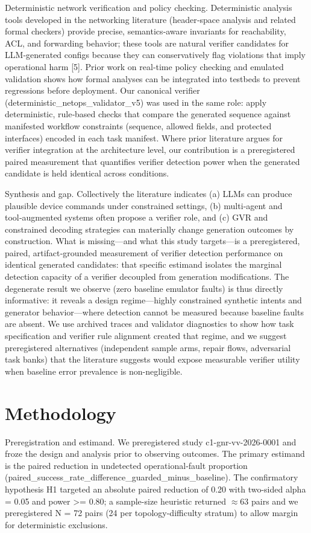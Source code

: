 \documentclass[conference]{IEEEtran}
\begin{document}
Deterministic network verification and policy checking. Deterministic analysis tools developed in the networking literature (header‑space analysis and related formal checkers) provide precise, semantics‑aware invariants for reachability, ACL, and forwarding behavior; these tools are natural verifier candidates for LLM‑generated configs because they can conservatively flag violations that imply operational harm [5]. Prior work on real‑time policy checking and emulated validation shows how formal analyses can be integrated into testbeds to prevent regressions before deployment. Our canonical verifier (deterministic\_netops\_validator\_v5) was used in the same role: apply deterministic, rule‑based checks that compare the generated sequence against manifested workflow constraints (sequence, allowed fields, and protected interfaces) encoded in each task manifest. Where prior literature argues for verifier integration at the architecture level, our contribution is a preregistered paired measurement that quantifies verifier detection power when the generated candidate is held identical across conditions.

Synthesis and gap. Collectively the literature indicates (a) LLMs can produce plausible device commands under constrained settings, (b) multi‑agent and tool‑augmented systems often propose a verifier role, and (c) GVR and constrained decoding strategies can materially change generation outcomes by construction. What is missing---and what this study targets---is a preregistered, paired, artifact‑grounded measurement of verifier detection performance on identical generated candidates: that specific estimand isolates the marginal detection capacity of a verifier decoupled from generation modifications. The degenerate result we observe (zero baseline emulator faults) is thus directly informative: it reveals a design regime---highly constrained synthetic intents and generator behavior---where detection cannot be measured because baseline faults are absent. We use archived traces and validator diagnostics to show how task specification and verifier rule alignment created that regime, and we suggest preregistered alternatives (independent sample arms, repair flows, adversarial task banks) that the literature suggests would expose measurable verifier utility when baseline error prevalence is non-negligible.

\section{Methodology}
Preregistration and estimand. We preregistered study c1-gnr-vv-2026-0001 and froze the design and analysis prior to observing outcomes. The primary estimand is the paired reduction in undetected operational‑fault proportion (paired\_success\_rate\_difference\_guarded\_minus\_baseline). The confirmatory hypothesis H1 targeted an absolute paired reduction of 0.20 with two-sided alpha = 0.05 and power >= 0.80; a sample-size heuristic returned \ensuremath{\approx}63 pairs and we preregistered N = 72 pairs (24 per topology-difficulty stratum) to allow margin for deterministic exclusions.
\end{document}
